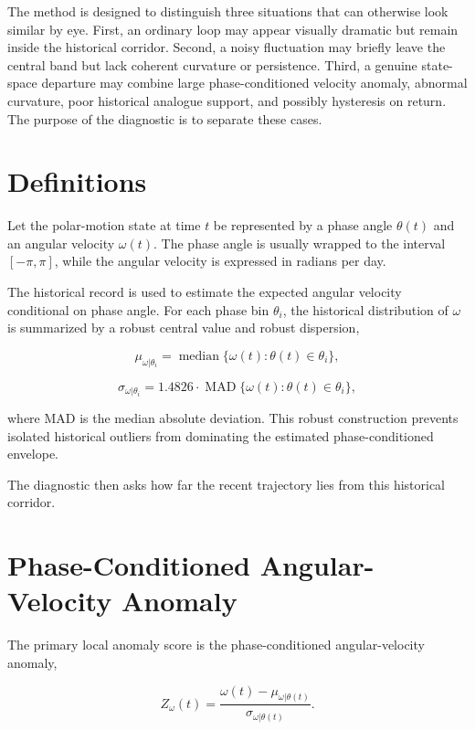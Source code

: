 \documentclass[11pt]{article}
\begin{document}
The method is designed to distinguish three situations that can otherwise look similar by eye. First, an ordinary loop may appear visually dramatic but remain inside the historical corridor. Second, a noisy fluctuation may briefly leave the central band but lack coherent curvature or persistence. Third, a genuine state-space departure may combine large phase-conditioned velocity anomaly, abnormal curvature, poor historical analogue support, and possibly hysteresis on return. The purpose of the diagnostic is to separate these cases.

\section{Definitions}

Let the polar-motion state at time \(t\) be represented by a phase angle \(\theta(t)\) and an angular velocity \(\omega(t)\). The phase angle is usually wrapped to the interval \([-\pi,\pi]\), while the angular velocity is expressed in radians per day.

The historical record is used to estimate the expected angular velocity conditional on phase angle. For each phase bin \(\theta_i\), the historical distribution of \(\omega\) is summarized by a robust central value and robust dispersion,

\begin{equation}
\mu_{\omega|\theta_i} = \operatorname{median}\{\omega(t): \theta(t) \in \theta_i\},
\end{equation}

\begin{equation}
\sigma_{\omega|\theta_i} = 1.4826 \cdot \operatorname{MAD}\{\omega(t): \theta(t) \in \theta_i\},
\end{equation}

where MAD is the median absolute deviation. This robust construction prevents isolated historical outliers from dominating the estimated phase-conditioned envelope.

The diagnostic then asks how far the recent trajectory lies from this historical corridor.

\section{Phase-Conditioned Angular-Velocity Anomaly}

The primary local anomaly score is the phase-conditioned angular-velocity anomaly,

\begin{equation}
Z_{\omega}(t) = \frac{\omega(t)-\mu_{\omega|\theta(t)}}{\sigma_{\omega|\theta(t)}}.
\end{equation}
\end{document}
